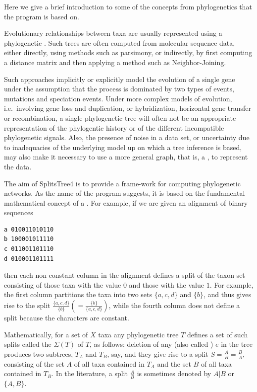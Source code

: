 \documentclass[11pt]{article}
\def\SplitsTree{{\sf SplitsTree4 }}
\begin{document}

Here we give a brief introduction to some of the concepts
from phylogenetics that the program is based on.

Evolutionary relationships between taxa are usually represented using  a
phylogenetic .
Such trees are often computed from molecular sequence
data, either directly, using methods such as parsimony, or indirectly,
by first computing a distance matrix and then applying a method such as
Neighbor-Joining.

Such approaches implicitly or explicitly model the evolution of a single
gene under the assumption that
the process is dominated by two types of events, mutations
and speciation events.
Under more complex models of evolution, i.e.\ involving gene loss and
duplication, or hybridization, horizontal gene transfer or recombination,
a single phylogenetic tree will often not be an appropriate representation
of the phylogentic history or of the different incompatible phylogenetic
signals. Also, the presence of noise in a data set, or uncertainty due
to inadequacies of the underlying model up on which a tree inference is
based, may also make it necessary to use a more general graph,
that is, a , to represent the data.

The aim of \SplitsTree is to provide a frame-work for computing phylogenetic
networks. As the name of the program suggests, it is based on the
fundamental mathematical concept of a .
For example, if we are given an alignment of binary sequences
\begin{verbatim}
a 010011010110
b 100001011110
c 011001101110
d 010001101111
\end{verbatim}
then each non-constant column in the alignment defines a split of the taxon set
consisting of those taxa with the value $0$ and those with the value $1$.
For example,
the first column partitions the taxa into two sets $\{a,c,d\}$  and  $\{b\}$,
and thus gives
rise to the split $\frac{\{a,c,d\}}{\{b\}}(=\frac{\{b\}}{\{a,c,d\}})$,
while the fourth
column does not define a split because the characters are constant.

Mathematically, for a set of $X$ taxa any phylogenetic tree $T$ defines a set
of such splits called the  $\Sigma(T)$ of $T$, as
follows:
deletion of any  (also called ) $e$ in the
tree produces two subtrees, $T_A$ and $T_B$,
say, and they give rise to a split $S=\frac{A}{B}=\frac{B}{A}$,
consisting of the set $A$ of all taxa contained in $T_A$ and the set $B$
of all taxa contained in $T_B$. In the literature, a split $\frac{A}{B}$ is sometimes denoted
by $A|B$ or $\{A,B\}$.
\end{document}
